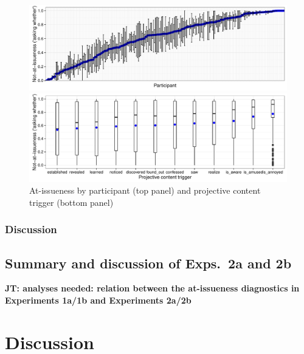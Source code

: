 \documentclass[11pt,fleqn]{article}
\newcommand{\6}{\mbox{$[\hspace*{-.6mm}[$}}
\newcommand{\9}{\mbox{$]\hspace*{-.6mm}]$}}
\newcommand{\jt}[1]{\textbf{\color{blue}JT: #1}}
\begin{document}
\begin{figure}[!h]
\begin{center}

\includegraphics[width=16cm]{../results/exp2b/graphs/ai-subjectmeans}

\includegraphics[width=16cm]{../results/exp2b/graphs/boxplot-not-at-issueness}

\end{center}
\caption{At-issueness by participant (top panel) and projective content trigger (bottom panel)}
\label{f-ai-2b}
\end{figure}

\subsubsection{Discussion}

\subsection{Summary and discussion of Exps.~2a and 2b}

\jt{analyses needed: relation between the at-issueness diagnostics in Experiments 1a/1b and Experiments 2a/2b}

\section{Discussion}\label{s5}
\end{document}

